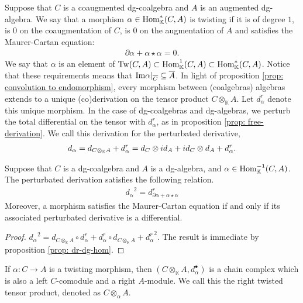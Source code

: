 \documentclass[../thesis.tex]{subfiles}
\begin{document}
            Suppose that $C$ is a coaugmented dg-coalgebra and $A$ is an augmented dg-algebra. We say that a morphism $\alpha\in \tt{Hom}_\mathbb{K}^*(C,A)$ is twisting if it is of degree $1$, is $0$ on the coaugmentation of $C$, is $0$ on the augmentation of $A$ and satisfies the Maurer-Cartan equation:
            \begin{align*}
                \partial\alpha + \alpha\star\alpha = 0\text{.}
            \end{align*}
            We say that $\alpha$ is an element of $\tt{Tw}(C,A)\subset \tt{Hom}_\mathbb{K}^{1}(C,A)\subset \tt{Hom}_\mathbb{K}^*(C,A)$. Notice that these requirements means that $\tt{Im}\alpha |_{\overline{C}} \subseteq \overline{A}$. In light of proposition \ref{prop: convolution to endomorphism}, every morphism between (coalgebras) algebras extends to a unique (co)derivation on the tensor product $C\otimes_\mathbb{K}A$. Let $d_\alpha^r$ denote this unique morphism. In the case of dg-coalgebras and dg-algebras, we perturb the total differential on the tensor with $d_\alpha^r$, as in proposition \ref{prop: free-derivation}. We call this derivation for the perturbated derivative,
            \begin{align*}
                d_\alpha = d_{C\otimes_\mathbb{K}A} + d_\alpha^r = d_C\otimes id_A + id_C\otimes d_A + d_\alpha^r\tt{.}
            \end{align*}
            \begin{proposition}\label{prop: twisted-differential}
                Suppose that $C$ is a dg-coalgebra and $A$ is a dg-algebra, and $\alpha\in \tt{Hom}_\mathbb{K}^{-1}(C,A)$. The perturbated derivation satisfies the following relation.
                \begin{align*}
                    {d_\alpha}^2 = d^r_{\partial \alpha + \alpha\star\alpha}
                \end{align*}
                Moreover, a morphism satisfies the Maurer-Cartan equation if and only if its associated perturbated derivative is a differential.
            \end{proposition}

            \begin{proof}
                ${d_\alpha}^2 = d_{C\otimes_\mathbb{K}A} \circ d_\alpha^r + d_\alpha^r \circ d_{C\otimes_\mathbb{K}A} + {d_\alpha^r}^2$. The result is immediate by proposition \ref{prop: dr-dg-hom}.
            \end{proof}

            \begin{corollary}
                If $\alpha: C\rightarrow A$ is a twisting morphism, then $(C\otimes_\mathbb{K}A, d_\alpha^\bullet)$ is a chain complex which is also a left $C$-comodule and a right $A$-module. We call this the right twisted tensor product, denoted as $C\otimes_\alpha A$.
            \end{corollary}
\end{document}
